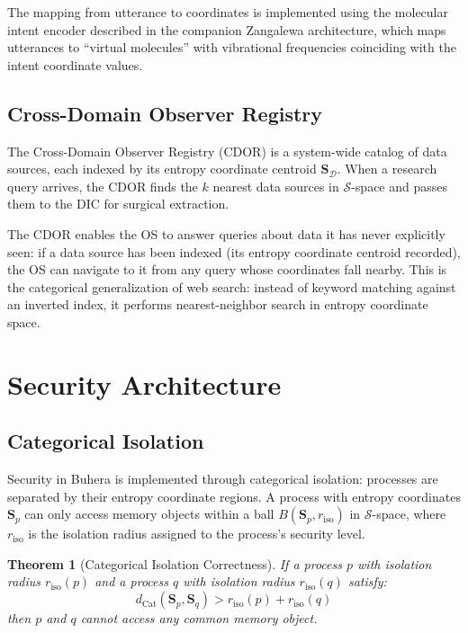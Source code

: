 \documentclass[12pt,twocolumn]{article}
\newtheorem{theorem}{Theorem}[section]
\DeclareMathOperator{\Cat}{Cat}
\begin{document}
The mapping from utterance to coordinates is implemented using the molecular intent encoder described in the companion Zangalewa architecture, which maps utterances to ``virtual molecules'' with vibrational frequencies coinciding with the intent coordinate values.

\subsection{Cross-Domain Observer Registry}

The Cross-Domain Observer Registry (CDOR) is a system-wide catalog of data sources, each indexed by its entropy coordinate centroid $\mathbf{S}_{\mathcal{D}}$. When a research query arrives, the CDOR finds the $k$ nearest data sources in $\mathcal{S}$-space and passes them to the DIC for surgical extraction.

The CDOR enables the OS to answer queries about data it has never explicitly seen: if a data source has been indexed (its entropy coordinate centroid recorded), the OS can navigate to it from any query whose coordinates fall nearby. This is the categorical generalization of web search: instead of keyword matching against an inverted index, it performs nearest-neighbor search in entropy coordinate space.

\section{Security Architecture}
\label{sec:security}

\subsection{Categorical Isolation}

Security in Buhera is implemented through categorical isolation: processes are separated by their entropy coordinate regions. A process with entropy coordinates $\mathbf{S}_p$ can only access memory objects within a ball $B(\mathbf{S}_p, r_{\text{iso}})$ in $\mathcal{S}$-space, where $r_{\text{iso}}$ is the isolation radius assigned to the process's security level.

\begin{theorem}[Categorical Isolation Correctness]
If a process $p$ with isolation radius $r_{\text{iso}}(p)$ and a process $q$ with isolation radius $r_{\text{iso}}(q)$ satisfy:
\begin{equation}
d_{\Cat}(\mathbf{S}_p, \mathbf{S}_q) > r_{\text{iso}}(p) + r_{\text{iso}}(q)
\end{equation}
then $p$ and $q$ cannot access any common memory object.
\end{theorem}
\end{document}
